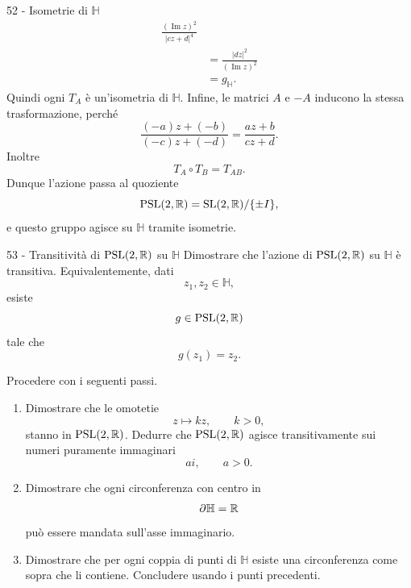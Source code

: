 \documentclass[a4paper]{article}
\begin{document}
\begin{snippetsolution}{52 - Isometrie di \(\mathbb{H}\)}
\begin{align*}
        {\frac{(\operatorname{Im}z)^2}{|cz+d|^4}}\\
        &=
        \frac{|dz|^2}{(\operatorname{Im}z)^2}\\
        &=
        g_{\mathbb{H}}.
    \end{align*}
    Quindi ogni \(T_A\) è un'isometria di \(\mathbb{H}\).
    Infine, le matrici \(A\) e \(-A\) inducono la stessa trasformazione, perché
    \[
        \frac{(-a)z+(-b)}{(-c)z+(-d)}
        =
        \frac{az+b}{cz+d}.
    \]
    Inoltre
    \[
        T_A\circ T_B=T_{AB}.
    \]
    Dunque l'azione passa al quoziente
    \[
        \operatorname{PSL}(2,\mathbb{R})
        =
        \operatorname{SL}(2,\mathbb{R})/\{\pm I\},
    \]
    e questo gruppo agisce su \(\mathbb{H}\) tramite isometrie.
\end{snippetsolution}

\begin{snippetexercise}{53 - Transitività di
    \(\operatorname{PSL}(2,\mathbb{R})\) su \(\mathbb{H}\)}
    Dimostrare che l'azione di \(\operatorname{PSL}(2,\mathbb{R})\)
    su \(\mathbb{H}\) è transitiva. Equivalentemente, dati
    \[
        z_1,z_2\in\mathbb{H},
    \]
    esiste
    \[
        g\in\operatorname{PSL}(2,\mathbb{R})
    \]
    tale che
    \[
        g(z_1)=z_2.
    \]

    Procedere con i seguenti passi.

    \begin{enumerate}
        \item Dimostrare che le omotetie
            \[
                z\longmapsto kz,
                \qquad
                k>0,
            \]
            stanno in \(\operatorname{PSL}(2,\mathbb{R})\). Dedurre che
            \(\operatorname{PSL}(2,\mathbb{R})\) agisce transitivamente
            sui numeri puramente immaginari
            \[
                ai,
                \qquad
                a>0.
            \]

        \item Dimostrare che ogni circonferenza con centro in
            \[
                \partial\mathbb{H}=\mathbb{R}
            \]
            può essere mandata sull'asse immaginario.

        \item Dimostrare che per ogni coppia di punti di \(\mathbb{H}\)
            esiste una circonferenza come sopra che li contiene. Concludere
            usando i punti precedenti.
    \end{enumerate}
\end{snippetexercise}
\end{document}
